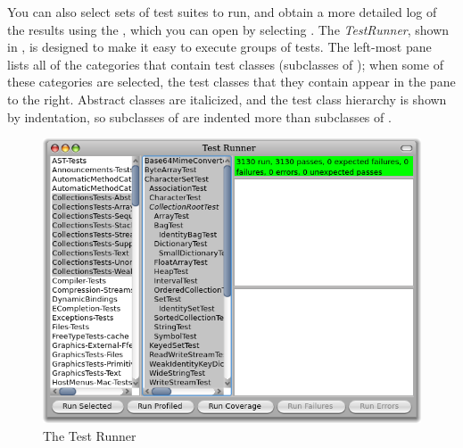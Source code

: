 \documentclass[a4paper,10pt,twoside]{book}
\begin{document}
You can also select sets of test suites to run, and obtain a more detailed log of the results using the \sunit {}, which you can open by selecting .
The \emph{TestRunner}, shown in , is designed to make it easy  to execute groups of tests.
The left-most pane lists all of the categories that contain test classes (\ie  subclasses of ); when some of these categories are selected, the test classes that they contain appear in the pane to the right.
Abstract classes are italicized, and the test class hierarchy is shown by indentation, so subclasses of  are indented more than subclasses of .

\begin{figure}[tbh]
  \begin{center}
	\includegraphics[width=\linewidth]{test-runner}
	\caption{The \pharo \sunit Test Runner}
  \end{center}
\end{figure}



\end{document}
